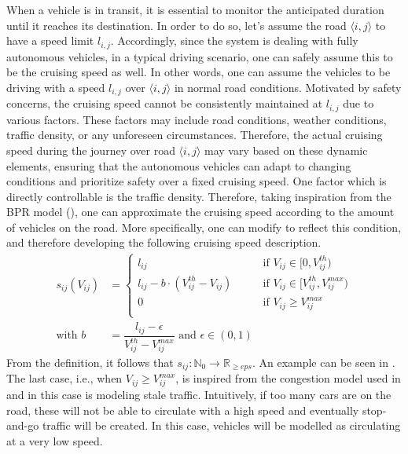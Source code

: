 When a vehicle is in transit, it is essential to monitor the anticipated duration until it reaches its destination. In order to do so, let's assume the road $\langle i,j\rangle$ to have a speed limit $l_{i,j}$. Accordingly, since the system is dealing with fully autonomous vehicles, in a typical driving scenario, one can safely assume this to be the cruising speed as well. In other words, one can assume the vehicles to be driving with a speed $l_{i,j}$ over $\langle i,j\rangle$ in normal road conditions. Motivated by safety concerns, the cruising speed cannot be consistently maintained at $l_{i,j}$ due to various factors. These factors may include road conditions, weather conditions, traffic density, or any unforeseen circumstances. Therefore, the actual cruising speed during the journey over road $\langle i,j\rangle$ may vary based on these dynamic elements, ensuring that the autonomous vehicles can adapt to changing conditions and prioritize safety over a fixed cruising speed. One factor which is directly controllable is the traffic density. Therefore, taking inspiration from the BPR model (), one can approximate the cruising speed according to the amount of vehicles on the road. More specifically, one can modify  to reflect this condition, and therefore developing the following cruising speed description. \\
\begin{equation}
	\begin{aligned}	
		s_{ij}(V_{ij}) &= \begin{cases}
			l_{ij} \quad\quad &\text{if } V_{ij}\in[0,V_{ij}^{th})\\ 
			l_{ij} - b\cdot(V_{ij}^{th}- V_{ij}) \quad\quad &\text{if }V_{ij}\in[V_{ij}^{th}, V_{ij}^{max})\\ 
			0\quad\quad &\text{if }V_{ij} \ge V_{ij}^{max}\\ 
		\end{cases}\\
		\text{with } b &= \dfrac{l_{ij}-\epsilon }{ V_{ij}^{th} - V_{ij}^{max}} \text{ and } \epsilon \in (0,1)
\end{aligned}
	\label{eq:model_bpr_approximation2}
\end{equation}
From the definition, it follows that $s_{ij}: \mathbb{N}_0 \rightarrow \mathbb{R}_{\ge eps}$.
An example can be seen in . The last case, i.e., when $V_{ij} \ge V_{ij}^{max}$, is inspired from the congestion model used in  and in this case is modeling stale traffic. Intuitively, if too many cars are on the road, these will not be able to circulate with a high speed and eventually stop-and-go traffic will be created. In this case, vehicles will be modelled as circulating at a very low speed. 

